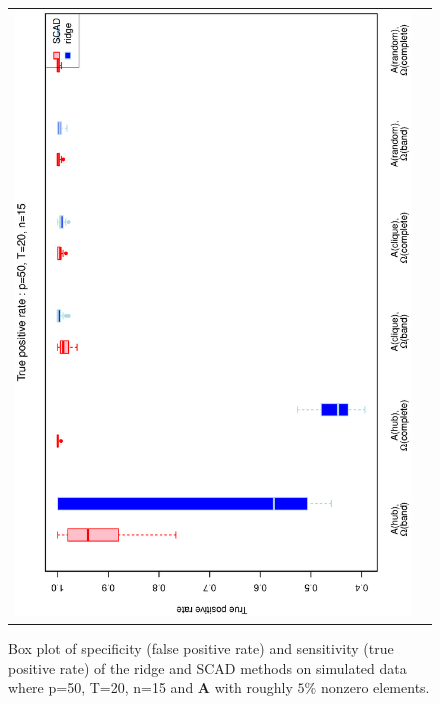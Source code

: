 \documentclass[a4paper]{article}
\begin{document}
\begin{figure}[h!]
\begin{tabular}{cc}
\includegraphics[scale=0.45,angle=270]{ROCtpr50T20N15_5.eps}
\end{tabular}
\caption{Box plot of specificity (false positive rate) and sensitivity (true positive rate) of the ridge and SCAD methods on simulated data where p=50, T=20,  n=15 and $\mathbf{A}$ with roughly $5\%$ nonzero elements.}
\label{figSM:RocP50T20N15_5}
\end{figure}
\clearpage

 
\end{document}
